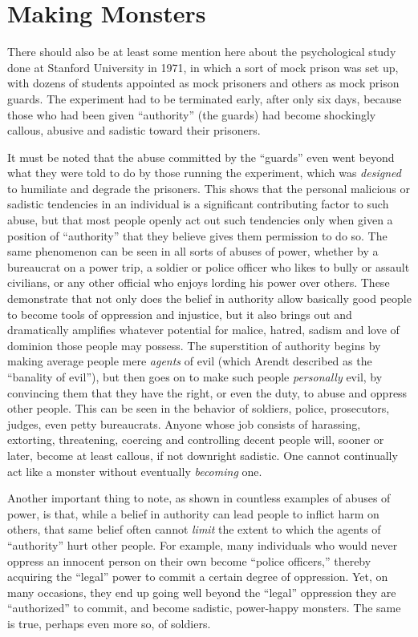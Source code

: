 \documentclass{book}
\begin{document}
\section{Making Monsters}

There should also be at least some mention here about the psychological study done at Stanford University in 1971, in which a sort of mock prison was set up, with dozens of students appointed as mock prisoners and others as mock prison guards. The experiment had to be terminated early, after only six days, because those who had been given \enquote{authority} (the guards) had become shockingly callous, abusive and sadistic toward their prisoners.

It must be noted that the abuse committed by the \enquote{guards} even went beyond what they were told to do by those running the experiment, which was \emph{designed} to humiliate and degrade the prisoners. This shows that the personal malicious or sadistic tendencies in an individual is a significant contributing factor to such abuse, but that most people openly act out such tendencies only when given a position of \enquote{authority} that they believe gives them permission to do so. The same phenomenon can be seen in all sorts of abuses of power, whether by a bureaucrat on a power trip, a soldier or police officer who likes to bully or assault civilians, or any other official who enjoys lording his power over others. These demonstrate that not only does the belief in authority allow basically good people to become tools of oppression and injustice, but it also brings out and dramatically amplifies whatever potential for malice, hatred, sadism and love of dominion those people may possess. The superstition of authority begins by making average people mere \emph{agents} of evil (which Arendt described as the \enquote{banality of evil}), but then goes on to make such people \emph{personally} evil, by convincing them that they have the right, or even the duty, to abuse and oppress other people. This can be seen in the behavior of soldiers, police, prosecutors, judges, even petty bureaucrats. Anyone whose job consists of harassing, extorting, threatening, coercing and controlling decent people will, sooner or later, become at least callous, if not downright sadistic. One cannot continually act like a monster without eventually \emph{becoming} one.

Another important thing to note, as shown in countless examples of abuses of power, is that, while a belief in authority can lead people to inflict harm on others, that same belief often cannot \emph{limit} the extent to which the agents of \enquote{authority} hurt other people. For example, many individuals who would never oppress an innocent person on their own become \enquote{police officers,} thereby acquiring the \enquote{legal} power to commit a certain degree of oppression. Yet, on many occasions, they end up going well beyond the \enquote{legal} oppression they are \enquote{authorized} to commit, and become sadistic, power-happy monsters. The same is true, perhaps even more so, of soldiers.
\end{document}
